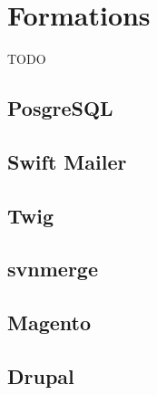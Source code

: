 \section{Formations}

TODO

\subsection{PosgreSQL}

\subsection{Swift Mailer}

\subsection{Twig}

\subsection{svnmerge}

\subsection{Magento}

\subsection{Drupal}
